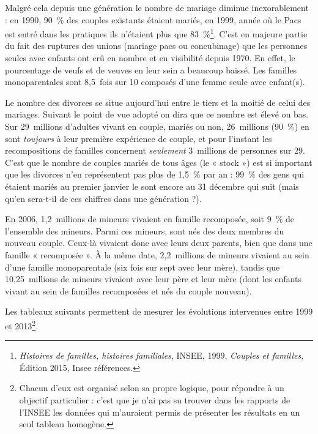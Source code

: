 Malgré cela depuis une génération le nombre de mariage diminue inexorablement : en 1990, 90~\% des couples existants étaient mariés, en 1999, année où le Pacs est entré dans les pratiques ils n'étaient plus que 83~\%\footnote{\emph{Histoires de familles, histoires familiales}, INSEE, 1999, \emph{Couples et familles}, Édition 2015, Insee références.}. C'est en majeure partie du fait des ruptures des unions (mariage pacs ou concubinage) que les personnes seules avec enfants ont crû en nombre et en visibilité depuis 1970. En effet, le pourcentage de veufs et de veuves en leur sein a beaucoup baissé. Les familles monoparentales sont 8,5~fois sur 10 composés d'une femme seule avec enfant(s). 
 
Le nombre des divorces se situe aujourd'hui entre le tiers et la moitié de celui des mariages. Suivant le point de vue adopté on dira que ce nombre est élevé ou bas. Sur 29~millions d'adultes vivant en couple, mariés ou non, 26~millions (90~\%) en sont \emph{toujours} à leur première expérience de couple, et pour l'instant les recompositions de familles concernent \emph{seulement} 3~millions de personnes sur 29. C'est que le nombre de couples mariés de tous âges (le « stock ») est si important que les divorces n'en représentent pas plus de 1,5~\% par an : 99~\% des gens qui étaient mariés au premier janvier le sont encore au 31 décembre qui suit (mais qu'en sera-t-il de ces chiffres dans une génération ?). 

En 2006, 1,2~millions de mineurs vivaient en famille recomposée, soit 9~\% de l'ensemble des mineurs. Parmi ces mineurs,  sont nés des deux membres du nouveau couple. Ceux-là vivaient donc avec leurs deux parents, bien que dans une famille « recomposée ». À la même date, 2,2~millions de mineurs vivaient au sein d'une famille monoparentale (six fois sur sept avec leur mère), tandis que 10,25~millions de mineurs
vivaient avec leur père et leur mère (dont les  enfants vivant au sein de familles recomposées et nés du couple nouveau).

Les tableaux suivants permettent de mesurer les évolutions intervenues entre 1999 et 2013\footnote{Chacun d'eux est organisé selon sa propre logique, pour répondre à un objectif particulier : c'est que je n'ai pas su  trouver dans les rapports de l'INSEE les données qui m'auraient permis de présenter les résultats en un seul tableau homogène.}.
 

\newlength{\largeurcolonne} %
\setlength{\largeurcolonne}{0.16666667\textwidth} %
\addtolength{\largeurcolonne}{-2\tabcolsep}


